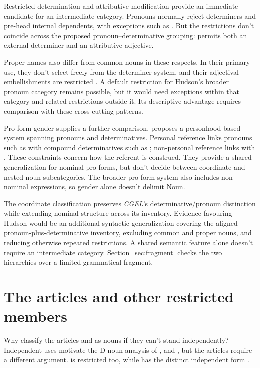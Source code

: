 \documentclass[12pt]{article}
\begin{document}
Restricted determination and attributive modification provide an immediate candidate for an intermediate category. Pronouns normally reject determiners and pre-head internal dependents, with exceptions such as  \citep[429--430]{huddleston2002}. But the restrictions don't coincide across the proposed pronoun--determinative grouping:  permits both an external determiner and an attributive adjective.

Proper names also differ from common nouns in these respects. In their primary use, they don't select freely from the determiner system, and their adjectival embellishments are restricted \citep[517, 519--520]{huddleston2002}. A default restriction for Hudson's broader pronoun category remains possible, but it would need exceptions within that category and related restrictions outside it. Its descriptive advantage requires comparison with these cross-cutting patterns.

Pro-form gender supplies a further comparison. \textcite{reynolds2025proformgender} proposes a personhood-based system spanning pronouns and determinatives. Personal reference links pronouns such as  with compound determinatives such as ; non-personal reference links  with . These constraints concern how the referent is construed. They provide a shared generalization for nominal pro-forms, but don't decide between coordinate and nested noun subcategories. The broader pro-form system also includes non-nominal expressions, so gender alone doesn't delimit Noun.

The coordinate classification preserves \textit{CGEL}'s determinative/pronoun distinction while extending nominal structure across its inventory. Evidence favouring Hudson would be an additional syntactic generalization covering the aligned pronoun-plus-determinative inventory, excluding common and proper nouns, and reducing otherwise repeated restrictions. A shared semantic feature alone doesn't require an intermediate category. Section~\ref{sec:fragment} checks the two hierarchies over a limited grammatical fragment.

\section{The articles and other restricted members}\label{sec:articles}

Why classify the articles  and  as nouns if they can't stand independently? Independent uses motivate the D-noun analysis of ,  and , but the articles require a different argument.  is restricted too, while  has the distinct independent form  \citep[371--372, 410--411]{huddleston2002}.
\end{document}
